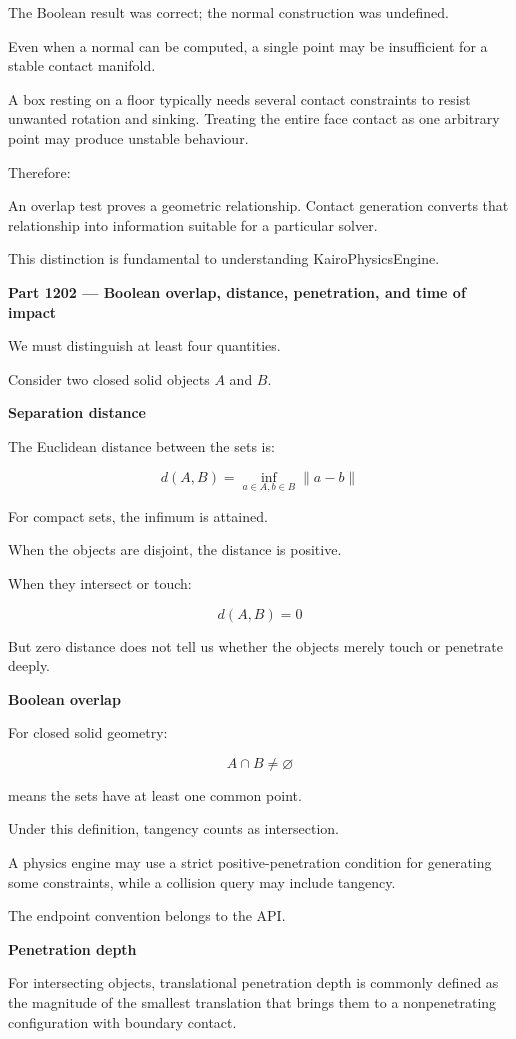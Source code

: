 The Boolean result was correct; the normal construction was undefined.

Even when a normal can be computed, a single point may be insufficient for a stable contact manifold.

A box resting on a floor typically needs several contact constraints to resist unwanted rotation and sinking. Treating the entire face contact as one arbitrary point may produce unstable behaviour.

Therefore:

An overlap test proves a geometric relationship. Contact generation converts that relationship into information suitable for a particular solver.

This distinction is fundamental to understanding KairoPhysicsEngine.

\textbf{Part 1202 --- Boolean overlap, distance, penetration, and time of impact}

We must distinguish at least four quantities.

Consider two closed solid objects \(A\) and \(B\).

\textbf{Separation distance}

The Euclidean distance between the sets is:

\[
\boxed{ d(A,B)=\inf_{a\in A,b\in B}\|a-b\| }
\]

For compact sets, the infimum is attained.

When the objects are disjoint, the distance is positive.

When they intersect or touch:

\[
d(A,B)=0
\]

But zero distance does not tell us whether the objects merely touch or penetrate deeply.

\textbf{Boolean overlap}

For closed solid geometry:

\[
\boxed{ A\cap B\ne\varnothing }
\]

means the sets have at least one common point.

Under this definition, tangency counts as intersection.

A physics engine may use a strict positive-penetration condition for generating some constraints, while a collision query may include tangency.

The endpoint convention belongs to the API.

\textbf{Penetration depth}

For intersecting objects, translational penetration depth is commonly defined as the magnitude of the smallest translation that brings them to a nonpenetrating configuration with boundary contact.

